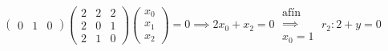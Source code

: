 \begin{example}
\begin{itemize}
            \[
                \begin{pmatrix}
                    0 & 1 & 0
                \end{pmatrix}
                \begin{pmatrix}
                    2 & 2 & 2 \\
                    2 & 0 & 1 \\
                    2 & 1 & 0
                \end{pmatrix}
                \begin{pmatrix}
                    x_0 \\ x_1 \\ x_2
                \end{pmatrix}
                = 0 \implies 2x_0 + x_2 = 0 \; \substack{\text{afín} \\ \implies \\ x_0 = 1}\; r_2 \colon 2 + y = 0
            \]
    \end{itemize}
\end{example}
